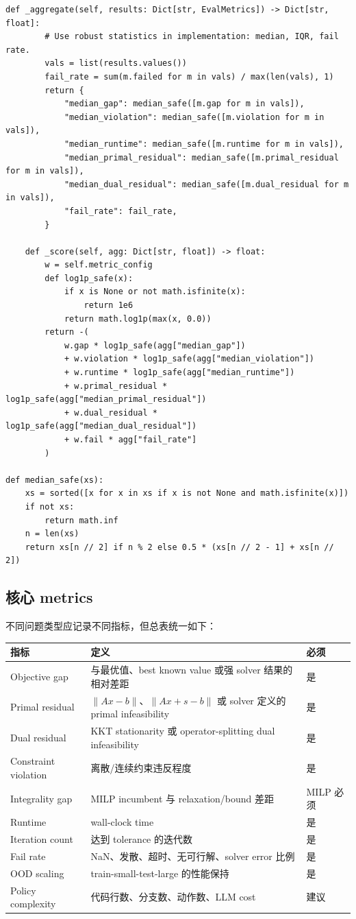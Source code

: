 \documentclass[12pt,a4paper]{ctexart}
\begin{document}
\begin{lstlisting}[style=pythonstyle]
    def _aggregate(self, results: Dict[str, EvalMetrics]) -> Dict[str, float]:
        # Use robust statistics in implementation: median, IQR, fail rate.
        vals = list(results.values())
        fail_rate = sum(m.failed for m in vals) / max(len(vals), 1)
        return {
            "median_gap": median_safe([m.gap for m in vals]),
            "median_violation": median_safe([m.violation for m in vals]),
            "median_runtime": median_safe([m.runtime for m in vals]),
            "median_primal_residual": median_safe([m.primal_residual for m in vals]),
            "median_dual_residual": median_safe([m.dual_residual for m in vals]),
            "fail_rate": fail_rate,
        }

    def _score(self, agg: Dict[str, float]) -> float:
        w = self.metric_config
        def log1p_safe(x):
            if x is None or not math.isfinite(x):
                return 1e6
            return math.log1p(max(x, 0.0))
        return -(
            w.gap * log1p_safe(agg["median_gap"])
            + w.violation * log1p_safe(agg["median_violation"])
            + w.runtime * log1p_safe(agg["median_runtime"])
            + w.primal_residual * log1p_safe(agg["median_primal_residual"])
            + w.dual_residual * log1p_safe(agg["median_dual_residual"])
            + w.fail * agg["fail_rate"]
        )

def median_safe(xs):
    xs = sorted([x for x in xs if x is not None and math.isfinite(x)])
    if not xs:
        return math.inf
    n = len(xs)
    return xs[n // 2] if n % 2 else 0.5 * (xs[n // 2 - 1] + xs[n // 2])
\end{lstlisting}

\subsection{核心 metrics}
不同问题类型应记录不同指标，但总表统一如下：
\begin{longtable}{p{}p{}p{}}
\toprule
指标 & 定义 & 必须 \\
\midrule
Objective gap & 与最优值、best known value 或强 solver 结果的相对差距 & 是 \\
Primal residual & $\|Ax-b\|$、$\|Ax+s-b\|$ 或 solver 定义的 primal infeasibility & 是 \\
Dual residual & KKT stationarity 或 operator-splitting dual infeasibility & 是 \\
Constraint violation & 离散/连续约束违反程度 & 是 \\
Integrality gap & MILP incumbent 与 relaxation/bound 差距 & MILP 必须 \\
Runtime & wall-clock time & 是 \\
Iteration count & 达到 tolerance 的迭代数 & 是 \\
Fail rate & NaN、发散、超时、无可行解、solver error 比例 & 是 \\
OOD scaling & train-small-test-large 的性能保持 & 是 \\
Policy complexity & 代码行数、分支数、动作数、LLM cost & 建议 \\
\bottomrule
\end{longtable}
\end{document}
